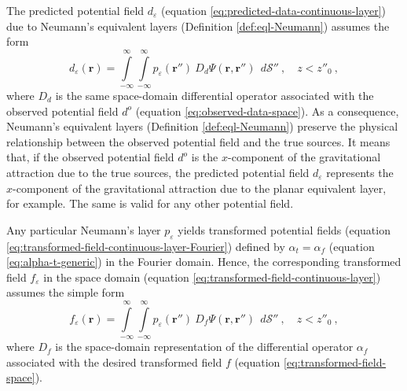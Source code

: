 The predicted potential field $d_{\varepsilon}$ (equation \ref{eq:predicted-data-continuous-layer}) 
due to Neumann's equivalent layers (Definition \ref{def:eql-Neumann}) assumes the form
\begin{equation}
	d_{\varepsilon}(\mathbf{r})
	= \int\limits_{-\infty}^{\infty}\int\limits_{-\infty}^{\infty}
	p_{\varepsilon}(\mathbf{r}'') \: D_{d} \Psi(\mathbf{r}, \mathbf{r}'') \:\: d\mathcal{S}''
	\: , \quad z < z''_{0} \: ,
	\label{eq:predicted-data-Neumann-layer}
\end{equation}
where $D_{d}$ is the same space-domain differential operator associated with
the observed potential field $d^{o}$ (equation \ref{eq:observed-data-space}).
As a consequence, Neumann's equivalent layers (Definition \ref{def:eql-Neumann}) preserve the physical
relationship between the observed potential field and the true sources.
It means that, if the observed potential field $d^{o}$ is the $x$-component of the 
gravitational attraction due to the true sources, the predicted potential field $d_{\varepsilon}$  
represents the $x$-component of the gravitational attraction due to the planar equivalent layer, for example.
The same is valid for any other potential field.

Any particular Neumann's layer $p_{\varepsilon}$ yields transformed potential 
fields (equation \ref{eq:transformed-field-continuous-layer-Fourier}) 
defined by $\alpha_{t} = \alpha_{f}$ (equation \ref{eq:alpha-t-generic}) in the Fourier domain. 
Hence, the corresponding transformed field $f_{\varepsilon}$ in the space domain 
(equation \ref{eq:transformed-field-continuous-layer}) assumes the simple form
\begin{equation}
	f_{\varepsilon}(\mathbf{r})
	= \int\limits_{-\infty}^{\infty}\int\limits_{-\infty}^{\infty}
	p_{\varepsilon}(\mathbf{r}'') \: D_{f} \Psi(\mathbf{r}, \mathbf{r}'') \:\: d\mathcal{S}''
	\: , \quad z < z''_{0} \: ,
	\label{eq:transformed-field-continuous-layer-Neumann}
\end{equation}
where $D_{f}$ is the space-domain representation of the differential operator $\alpha_{f}$ 
associated with the desired transformed field $f$ (equation \ref{eq:transformed-field-space}).

